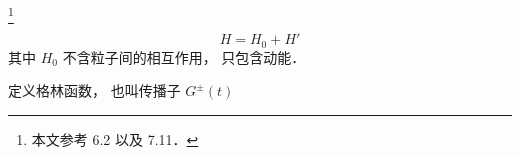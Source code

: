 
\footnote{本文参考 \cite{Newton} 6.2 以及 \cite{Sakurai} 7.11．}

\begin{equation}
H = H_0 + H'
\end{equation}
其中 $H_0$ 不含粒子间的相互作用， 只包含动能．

定义格林函数， 也叫传播子 $G^\pm(t)$